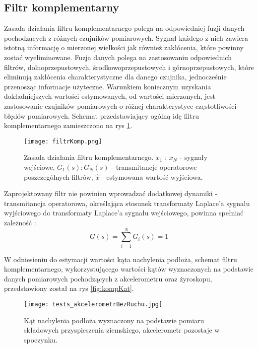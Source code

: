 \subsection{Filtr komplementarny}
\label{kompZasadaDzialania}
Zasada działania filtru komplementarnego polega na odpowiedniej fuzji danych pochodzących z różnych czujników pomiarowych. Sygnał każdego z nich zawiera istotną informację o mierzonej wielkości jak również zakłócenia, które powinny zostać wyeliminowane. Fuzja danych polega na zastosowaniu odpowiednich filtrów, dolnoprzepustowych, środkowoprzepustowych i górnoprzepustowych, które eliminują zakłócenia charakterystyczne dla danego czujnika, jednocześnie przenosząc informacje użyteczne. Warunkiem koniecznym uzyskania dokładniejszych wartości estymowanych, od wartości mierzonych, jest zastosowanie czujników pomiarowych o różnej charakterystyce częstotliwości błędów pomiarowych. Schemat przedstawiający ogólną idę filtru komplementarnego zamieszczono na rys \ref{fig:kompGeneral}.
\begin{figure}[h]
    \centering
    \texttt{[image: filtrKomp.png]}
    \caption{Zasada działania filtru komplementarnego. $x_1$ : $x_N$ - sygnały wejściowe, $G_1(s) : G_N(s)$ - transmitancje operatorowe poszczególnych filtrów, $\hat{x}$ - estymowana wartość wyjściowa.}
    \label{fig:kompGeneral}
\end{figure}

Zaprojektowany filtr nie powinien wprowadzać dodatkowej dynamiki - transmitancja operatorowa, określająca stosunek transformaty Laplace'a sygnału wyjściowego do transformaty Laplace'a sygnału wejściowego, powinna spełniać zależność \cite{komplementarny}:
\begin{equation}
    G(s)=\sum_{i=1}^{N}G_{i}(s)=1
    \label{eq:zasadaKomplementarnosci}
\end{equation}

W odniesieniu do estymacji wartości kąta nachylenia podłoża, schemat filtru komplementarnego, wykorzystującego wartości kątów wyznaczonych na podstawie danych pomiarowych pochodzących z akcelerometru oraz żyroskopu, przedstawiony został na rys \ref{fig:kompKat}. 

\begin{figure}[h]
    \centering
    \texttt{[image: tests\_akcelerometrBezRuchu.jpg]}
    \caption{Kąt nachylenia podłoża wyznaczony na podstawie pomiaru składowych przyspieszenia ziemskiego, akcelerometr pozostaje w spoczynku.}
    \label{fig:tests_akcelerometrBezRuchu}
\end{figure}

